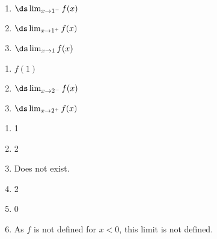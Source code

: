 {
\noindent\begin{minipage}{\linewidth}\centering
{}
\end{minipage}

\noindent\begin{minipage}[t]{.5\linewidth}
\begin{enumerate}
\item		$\ds \lim_{x\to 1^-} f(x)$
\item		$\ds \lim_{x\to 1^+} f(x)$
\item		$\ds \lim_{x\to 1} f(x)$
\end{enumerate}
\end{minipage}
\noindent\begin{minipage}[t]{.5\linewidth}
\begin{enumerate}\addtocounter{enumii}{3}
\item		$f(1)$
\item		$\ds \lim_{x\to 2^-} f(x)$
\item		$\ds \lim_{x\to 2^+} f(x)$
\end{enumerate}
\end{minipage}
}
{\begin{enumerate}
\item		1
\item		2
\item		Does not exist.
\item		2
\item		0
\item	 	As $f$ is not defined for $x<0$, this limit is not defined.
\end{enumerate}
}


